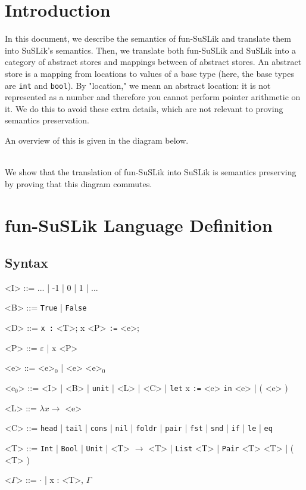 \documentclass[10pt]{article}
\newcommand{\ttt}[1]{\texttt{#1}}
\newcommand{\ra}{\ensuremath{\rightarrow}}
\newcommand{\head}{\ttt{head}}
\newcommand{\tail}{\ttt{tail}}
\newcommand{\cons}{\ttt{cons}}
\newcommand{\nil}{\ttt{nil}}
\newcommand{\foldr}{\ttt{foldr}}
\newcommand{\pair}{\ttt{pair}}
\newcommand{\fst}{\ttt{fst}}
\newcommand{\snd}{\ttt{snd}}
\newcommand{\ite}{\ttt{if}}
\newcommand{\letbnd}{\ttt{let}}
\newcommand{\inexpr}{\ttt{in}}
\newcommand{\lesseq}{\ttt{le}}
\newcommand{\eq}{\ttt{eq}}
\newcommand{\sem} [1] {\llbracket#1\rrbracket}
\newcommand{\Gsem} [1] {\mathcal{G}\sem{#1}}
\newcommand{\Ssem} [1] {\mathcal{S}\sem{#1}}
\begin{document}
\section{Introduction}

In this document, we describe the semantics of fun-SuSLik and translate them
into SuSLik's semantics. Then, we translate both fun-SuSLik and SuSLik into a
category of abstract stores and mappings between of abstract stores. An abstract store is a
mapping from locations to values of a base type (here, the base types are \verb|int| and \verb|bool|).
By "location," we mean an abstract location: it is not represented as a number and therefore
you cannot perform pointer arithmetic on it. We do this to avoid these extra details, which
are not relevant to proving semantics preservation.

An overview of this is given in the diagram below.
\\


~\\
\noindent
We show that the translation of fun-SuSLik into SuSLik is semantics preserving by proving that this diagram commutes.


\section{fun-SuSLik Language Definition}
\subsection{Syntax}

\begin{grammar}
  <I> ::= ... | -1 | 0 | 1 | ...

  <B> ::= \ttt{True} | \ttt{False}

  <D> ::= \ttt{x :} <T>; x <P> \ttt{:=} <e>;

  <P> ::= $\varepsilon$ | x <P>

  <e> ::= <e>$_0$ | <e> <e>$_0$

  <e$_0$> ::= <I> | <B> | \ttt{unit} | <L> | <C> | \letbnd\; x \ttt{:=} <e> \inexpr\; <e> | ( <e> )

  <L> ::= $\lambda x \ra$ <e>

  <C> ::= \head\; | \tail\; | \cons\; | \nil\; | \foldr\; | \pair\; | \fst\; | \snd\; | \ite\; | \lesseq\; | \eq

  <T> ::= \ttt{Int} | \ttt{Bool} | \ttt{Unit} | <T> $\ra$ <T> | \ttt{List} <T> | \ttt{Pair} <T> <T> | ( <T> )

  <$\Gamma$> ::= $\cdot$ | x : <T>, $\Gamma$
\end{grammar}
\end{document}
